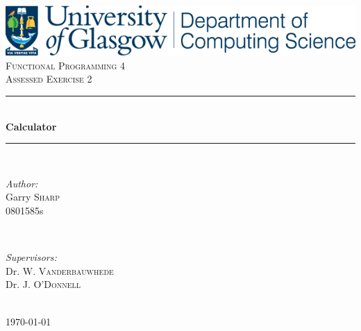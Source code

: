 \documentclass[12pt]{article} %
\begin{document}

\begin{titlepage}

\newcommand{\HRule}{\rule{\linewidth}{0.5mm}} %
\center %
\includegraphics[width=\textwidth]{Glasgow}\\[1.5cm]
\textsc{\LARGE Functional Programming 4}\\[0.5cm] %
\textsc{\Large Assessed Exercise 2}\\[0.5cm] %

\HRule \\[0.4cm]
{ \huge \bfseries Calculator}\\[0.4cm] %
\HRule \\[1.5cm]

\begin{minipage}{0.4\textwidth}
\begin{flushleft} \large
\emph{Author:}\\
Garry \textsc{Sharp}\\
0801585s\\ %
\end{flushleft}
\end{minipage}
~
\begin{minipage}{0.5\textwidth}
\begin{flushright} \large
\emph{Supervisors:} \\
Dr. W. \textsc{Vanderbauwhede}\\
Dr. J. \textsc{O'Donnell}\\
\end{flushright}
\end{minipage}\\[4cm]

{\large \today}\\[3cm] %

\vfill %

\end{titlepage}
\newpage
\tableofcontents
\newpage
\end{document}
